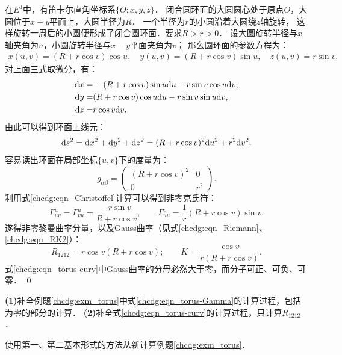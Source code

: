 在$E^3$中，有笛卡尔直角坐标系$\{O;x,y,z\}$．
闭合圆环面的大圆圆心处于原点$O$，大圆位于$x-y$平面上，大圆半径为$R$．
一个半径为$r$的小圆沿着大圆绕$z$轴旋转，
这样旋转一周后的小圆便形成了闭合圆环面．要求$R>r>0$．
设大圆旋转半径与$x$轴夹角为$u$，小圆旋转半径与$x-y$平面夹角为$v$；
那么圆环面的参数方程为：
\begin{align*}
		x(u,v)= (R+r \cos v )\cos u , \quad
		y(u,v)= (R+r \cos v )\sin u , \quad
		z(u,v)= r \sin v .
\end{align*}
对上面三式取微分，有：
\begin{align*}
	{\rm d}x = & -(R+r \cos v) \sin u {\rm d}u - r \sin v \cos u  {\rm d} v, \\
	{\rm d}y = & (R+r \cos v) \cos u {\rm d}u - r \sin v \sin u  {\rm d} v, \\
	{\rm d}z = & r \cos v {\rm d}v .
\end{align*}
由此可以得到环面上线元：
\begin{equation*}
	{\rm d}s^2 = {\rm d}x^2+{\rm d}y^2+{\rm d}z^2 = (R+r \cos v)^2  {\rm d}u^2 + r^2   {\rm d}v^2.
\end{equation*}
容易读出环面在局部坐标$\{u,v\}$下的度量为：
\begin{equation*}
	g_{\alpha\beta}= \begin{pmatrix}(R+r \cos v)^2 &0 \\ 0& r^2\end{pmatrix}.
\end{equation*}
利用式\eqref{chcdg:eqn_Christoffel}计算可以得到非零克氏符：
\begin{equation}\label{chcdg:eqn_torus-Gamma}
	\Gamma^u_{uv}=\Gamma^u_{vu}=\frac{-r \sin v}{R+r \cos v},\qquad
	\Gamma^v_{uu}=\frac{1}{r}(R+r \cos v) \sin v.
\end{equation}
遂得非零黎曼曲率分量，以及Gauss曲率（见式\eqref{chcdg:eqn_Riemann}、\eqref{chcdg:eqn_RK2}）：
\begin{equation}\label{chcdg:eqn_torus-curv}
	R_{1212}=r \cos v (R+r \cos v) ; \qquad  	K=\frac{\cos v}{r(R+r \cos v) } .
\end{equation}
式\eqref{chcdg:eqn_torus-curv}中Gauss曲率的分母必然大于零，而分子可正、可负、可零．
\qed


\begin{exercise}
	{\bfseries (1)}补全例题\ref{chcdg:exm_torus}中式\eqref{chcdg:eqn_torus-Gamma}的计算过程，包括为零的部分的计算．
	{\bfseries (2)}补全式\eqref{chcdg:eqn_torus-curv}的计算过程，只计算$R_{1212}$．
\end{exercise}

\begin{exercise}
	使用第一、第二基本形式的方法从新计算例题\ref{chcdg:exm_torus}．
\end{exercise}


